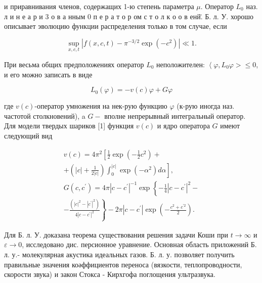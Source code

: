 \documentclass[10pt]{article}
\begin{document}
и приравнивания членов, содержащих 1-ю степень параметра $\mu$. Оператор $L_{0}$ наз. л и н е а р и 3 о в а нным 0 п е р а т о р ом с т о л к о о в енй̈. Б. л. У. хорошо описывает эволюцию функции распределения только в том случае, если



\[

\sup _{x, c, t}\left|f(x, c, t)-\pi^{-3 / 2} \exp \left(-c^{2}\right)\right| \ll 1 .

\]



При весьма общих предположениях оператор $L_{0}$ неположителен: $\left\langle\varphi, L_{0} \varphi>\leqslant 0\right.$, и его можно записать в виде



\[

L_{0}(\varphi)=-v(c) \varphi+G \varphi

\]



где $v(c)$-оператор умножения на нек-рую функцию $\varphi$ (к-рую иногда наз. частотой столкновений), a $G-$ вполне непрерывный интегральный оператор. Для модели твердых шариков [1] функция $v(c)$ и ядро оператора $G$ имеют следующий вид



\[

\begin{gathered}

v(c)=4 \pi^{2}\left[\frac{1}{2} \exp \left(-\frac{1}{2} c^{2}\right)+\right. \\

\left.+\left(|c|+\frac{1}{2|c|}\right) \int_{0}^{|c|} \exp \left(-\alpha^{2}\right) d \alpha\right], \\

G\left(c, c^{\prime}\right)=4 \pi\left|c-c^{\prime}\right|^{-1} \exp \left\{-\frac{1}{4}\left|c-c^{\prime}\right|^{2}-\right. \\

\left.-\frac{\left(|c|^{2}-\left|c^{\prime}\right|^{2}\right)}{4\left|c-c^{\prime}\right|^{2}}\right\}-2 \pi\left|c-c^{\prime}\right| \exp \left(-\frac{c^{2}+c^{\prime 2}}{2}\right) .

\end{gathered}

\]



Для Б. л. У. доказана теорема существования решения задачи Коши при $t \rightarrow \infty$ и $\varepsilon \rightarrow 0$, исследовано дис. персионное уравнение. Основная область приложений Б. л. у.- молекулярная акустика идеальных газов. Б. л. у. позволяет получить правильные значения коәффициентов переноса (вязкости, теплопроводности, скорости звука) и закон Стокса - Кирхгофа поглощения ультразвука.
\end{document}
